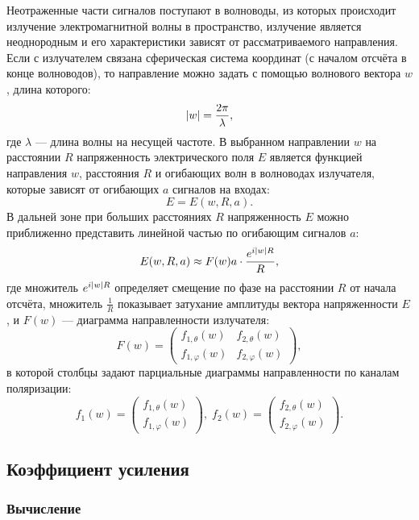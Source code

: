 Неотраженные части сигналов поступают в волноводы, из которых происходит излучение электромагнитной волны в пространство, излучение является неоднородным и его характеристики
зависят от рассматриваемого направления. Если с излучателем связана сферическая система координат (с началом отсчёта в конце волноводов), то направление можно задать с
помощью волнового вектора $w$, длина которого:
\[
    \left | w \right | = \frac{2 \pi}{\lambda},
\]
где $\lambda$ --- длина волны на несущей частоте. В выбранном направлении $w$ на расстоянии $R$ напряженность электрического поля $E$ является функцией
направления $w$, расстояния $R$ и огибающих волн в волноводах излучателя, которые зависят от огибающих $a$ сигналов на входах:
\[
    E = E(w, R, a).
\]
В дальней зоне при больших расстояниях $R$ напряженность $E$ можно приближенно представить линейной частью по огибающим сигналов $a$:
\begin{equation}
    \label{emission:emitter:diagram:tension}
    E(w,R,a)
    \approx F(w) a \cdot \frac{e^{i \left | w \right | R}}{R} ,
\end{equation}
где множитель $e^{i \left | w \right | R}$ определяет смещение по фазе на расстоянии $R$ от начала отсчёта, множитель $\frac{1}{R}$ показывает затухание амплитуды
вектора напряженности $E$, и $F(w)$ --- диаграмма направленности излучателя:
\[
    F(w)
    = \begin{pmatrix}
          f_{1, \theta}(w)  & f_{2, \theta}(w)  \\
          f_{1, \varphi}(w) & f_{2, \varphi}(w)
    \end{pmatrix} ,
\]
в которой столбцы задают парциальные диаграммы направленности по каналам поляризации:
\[
    f_1(w)
    = \begin{pmatrix}
          f_{1,\theta}(w) \\
          f_{1,\varphi}(w)
    \end{pmatrix}
    , \;
    f_2(w)
    = \begin{pmatrix}
          f_{2,\theta}(w) \\
          f_{2,\varphi}(w)
    \end{pmatrix}
    .
\]

\subsection{Коэффициент усиления}

\subsubsection{Вычисление}

